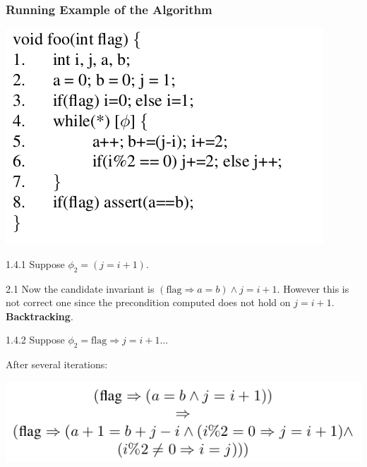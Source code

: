 \documentclass[11pt]{beamer}
\begin{document}
\begin{frame}\frametitle{Running Example of the Algorithm}

\begin{center}

\includegraphics[scale=0.25]{exp.png}

\end{center}
1.4.1 Suppose $\phi_2 = (j = i + 1)$.

2.1 Now the candidate invariant is $(\text{flag}\Rightarrow a = b) \wedge j = i + 1$. However this is not correct one since the precondition computed does not hold on $j = i + 1$. \textbf{Backtracking}.

1.4.2 Suppose $\phi_2 = \text{flag}\Rightarrow  j = i + 1$...  

After several iterations: 

\begin{center}
\includegraphics[scale=0.4]{resultInv.png}
\end{center}
\end{frame}
\end{document}
